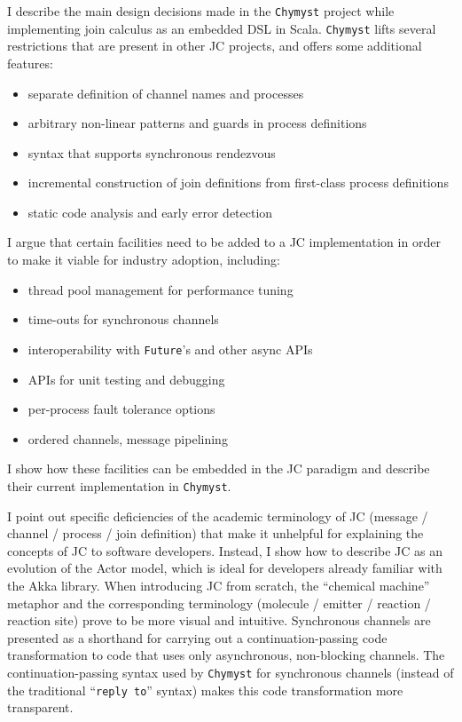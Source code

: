 \documentclass[sigplan,10pt]{acmart}\settopmatter{}
\begin{document}
I describe the main design decisions made in the \texttt{Chymyst}
project while implementing join calculus as an embedded DSL in Scala. 
\texttt{Chymyst} lifts several restrictions that are present in other
JC projects, and offers some additional features:
\begin{itemize}
\item separate definition of channel names and processes
\item arbitrary non-linear patterns and guards in process definitions
\item syntax that supports synchronous rendezvous
\item incremental construction of join definitions from first-class process
definitions
\item static code analysis and early error detection
\end{itemize}
I argue that certain facilities need to be added to a JC implementation
in order to make it viable for industry adoption, including:
\begin{itemize}
\item thread pool management for performance tuning
\item time-outs for synchronous channels
\item interoperability with \texttt{Future}'s and other async APIs
\item APIs for unit testing and debugging
\item per-process fault tolerance options
\item ordered channels, message pipelining
\end{itemize}
I show how these facilities can be embedded in the JC paradigm
and describe their current implementation in \texttt{Chymyst}.

I point out specific deficiencies of the academic terminology of JC
(message / channel / process / join definition) that make it unhelpful
for explaining the concepts of JC to software developers. Instead,
I show how to describe JC as an evolution of the Actor model, which
is ideal for developers already familiar with the Akka library. When
introducing JC from scratch, the ``chemical machine''
metaphor and the corresponding terminology (molecule / emitter
/ reaction / reaction site) prove to be more visual and intuitive. Synchronous
channels are presented as a shorthand for carrying out a continuation-passing
code transformation to code that uses only asynchronous,
non-blocking channels. The continuation-passing syntax used by \texttt{Chymyst}
for synchronous channels (instead of the traditional ``\texttt{reply
to}'' syntax) makes this code transformation more transparent.
\end{document}
